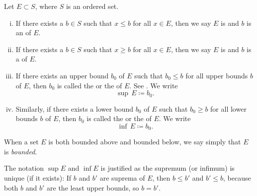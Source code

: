 \begin{defn}
Let $E \subset S$, where $S$ is an ordered set.
\begin{enumerate}[(i)]
\item If there exists a $b \in S$ such that $x \leq b$ for all $x \in E$,
then we say $E$ is \emph{} and $b$
is an \emph{} of $E$.
\item If there exists a $b \in S$ such that $x \geq b$ for all $x \in E$,
then we say $E$ is \emph{} and $b$
is a \emph{} of $E$.
\item If there exists an upper bound $b_0$ of $E$ such that
$b_0 \leq b$ for all upper bounds $b$ of $E$, then
$b_0$ is called the \emph{} or
the \emph{}
of $E$.  See .  We write
\begin{equation*}
\sup\, E \coloneqq b_0 .
\end{equation*}
\item Similarly, if there exists a lower bound $b_0$ of $E$ such that
$b_0 \geq b$ for all lower bounds $b$ of $E$, then
$b_0$ is called the \emph{} or
the \emph{}
of $E$.  We write
\begin{equation*}
\inf\, E \coloneqq b_0 .
\end{equation*}
\end{enumerate}
When a set $E$ is both bounded above and bounded below, we say simply that
$E$ is \emph{bounded}.
\end{defn}

The notation $\sup E$ and $\inf E$ is justified as
the
supremum (or infimum) is unique (if it exists): If $b$ and
$b'$ are suprema of $E$, then $b \leq b'$ and $b' \leq b$, because both
$b$ and $b'$ are the least upper bounds, so $b=b'$.


\begin{myfigureht}
\caption{A set $E$ bounded above and the least upper bound of $E$.\label{fig:lub}}
\end{myfigureht}

